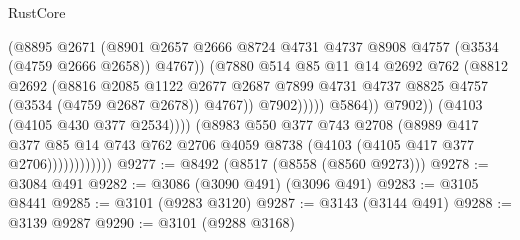 \begin{lexlean}{RustCore}
\begin{coremodule}
                                        (@8895
                                          @2671
                                          (@8901
                                            @2657
                                            @2666
                                            @8724
                                            @4731
                                            @4737
                                            @8908
                                            @4757
                                            (@3534 (@4759 @2666 @2658))
                                            @4767))
                                        (@7880
                                          @514
                                          @85
                                          @11
                                          @14
                                          @2692
                                          @762
                                          (@8812
                                            @2692
                                            (@8816
                                              @2085
                                              @1122
                                              @2677
                                              @2687
                                              @7899
                                              @4731
                                              @4737
                                              @8825
                                              @4757
                                              (@3534 (@4759 @2687 @2678))
                                              @4767))
                                          @7902)))))
                                @5864))
                            @7902))
                        (@4103 (@4105 @430 @377 @2534))))
                    (@8983
                      @550
                      @377
                      @743
                      @2708
                      (@8989
                        @417
                        @377
                        @85
                        @14
                        @743
                        @762
                        @2706
                        @4059
                        @8738
                        (@4103 (@4105 @417 @377 @2706))))))))))))
@9277 := @8492 (@8517 (@8558 (@8560 @9273)))
@9278 := @3084 @491
@9282 := @3086 (@3090 @491) (@3096 @491)
@9283 := @3105 @8441
@9285 := @3101 (@9283 @3120)
@9287 := @3143 (@3144 @491)
@9288 := @3139 @9287
@9290 := @3101 (@9288 @3168)

\end{coremodule}
\end{lexlean}
